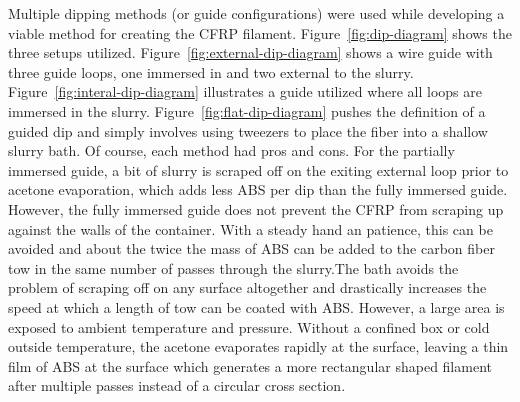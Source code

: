
%
%

Multiple dipping methods (or guide configurations) were used while developing a viable method for creating the CFRP filament. Figure~\ref{fig:dip-diagram} shows the three setups utilized. Figure~\ref{fig:external-dip-diagram} shows a wire guide with three guide loops, one immersed in and two external to the slurry. Figure~\ref{fig:interal-dip-diagram} illustrates a guide utilized where all loops are immersed in the slurry. Figure~\ref{fig:flat-dip-diagram} pushes the definition of a guided dip and simply involves using tweezers to place the fiber into a shallow slurry bath. Of course, each method had pros and cons. For the partially immersed guide, a bit of slurry is scraped off on the exiting external loop prior to acetone evaporation, which adds less ABS per dip than the fully immersed guide. However, the fully immersed guide does not prevent the CFRP from scraping up against the walls of the container. With a steady hand an patience, this can be avoided and about the twice the mass of ABS can be added to the carbon fiber tow in the same number of passes through the slurry.The bath avoids the problem of scraping off on any surface altogether and drastically increases the speed at which a length of tow can be coated with ABS. However, a large area is exposed to ambient temperature and pressure. Without a confined box or cold outside temperature, the acetone evaporates rapidly at the surface, leaving a thin film of ABS at the surface which generates a more rectangular shaped filament after multiple passes instead of a circular cross section. \\

